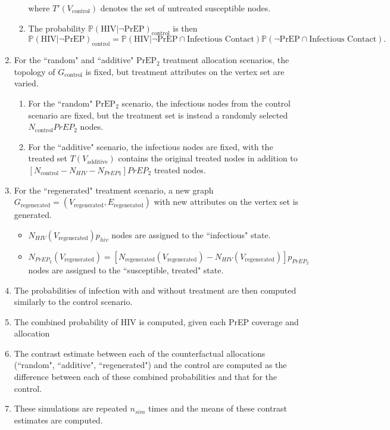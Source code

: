 \documentclass{article}
\theoremstyle{definition}
\begin{document}
\begin{enumerate}
\begin{enumerate}
    where $T'\left(V_{\text{control}}\right)$ denotes the set of untreated susceptible nodes.
    \item The probability $\mathbb{P}\left(\text{HIV} \vert \neg \text{PrEP}\right)_{\text{control}}$ is then
    \begin{equation}
        \mathbb{P}\left(\text{HIV} \vert \neg \text{PrEP}\right)_{\text{control}}=\mathbb{P}\left(\text{HIV} \vert \neg \text{PrEP} \cap \text{Infectious Contact}\right) \mathbb{P}\left( \neg \text{PrEP} \cap \text{Infectious Contact}\right).
    \end{equation}
    \end{enumerate}
    \item For the ``random" and ``additive" $\text{PrEP}_{2}$ treatment allocation  scenarios, the topology of $G_{\text{control}}$ is fixed, but treatment attributes on the vertex set are varied. 
    \begin{enumerate}
        \item For the ``random" $\text{PrEP}_{2}$ scenario, the infectious nodes from the control scenario are fixed, but the treatment set is instead a randomly selected $N_{\text{control}}PrEP_{2}$ nodes.
        \item For the ``additive" scenario, the infectious nodes are fixed, with the treated set $T\left(V_{\text{additive}}\right)$ contains the original treated nodes in addition to $\left[N_{\text{control}}-N_{HIV}-N_{PrEP1}\right]PrEP_{2}$ treated nodes.
    \end{enumerate}
    \item For the ``regenerated" treatment scenario, a new graph $G_{\text{regenerated}}=\left(V_{ \text{regenerated}},E_{\text{regenerated}}\right)$ with new attributes on the vertex set is generated.
    \begin{itemize}
        \item $N_{HIV}\left(V_{\text{regenerated}}\right)p_{hiv}$ nodes are assigned to the ``infectious" state.
        \item $N_{PrEP_{2}}\left(V_{\text{regenerated}}\right)=\left[N_{\text{regenerated}}\left(V_{\text{regenerated}}\right)-N_{HIV}\left(V_{\text{regenerated}}\right)\right]p_{PrEP_{2}}$ nodes are assigned to the ``susceptible, treated" state. 
    \end{itemize}
    \item The probabilities of infection with and without treatment are then computed similarly to the control scenario.
    \item The combined probability of HIV is computed, given each PrEP coverage and allocation
    \item The contrast estimate between each of the counterfactual allocations (``random", ``additive", ``regenerated") and the control are computed as the difference  between each of these combined probabilities and that for the control.
    \item These simulations are repeated $n_{sim}$ times and the means of these contrast estimates are computed.
\end{enumerate}
\end{document}
